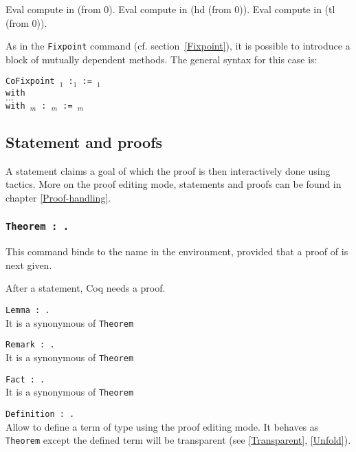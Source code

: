 \begin{coq_example}
Eval compute in (from 0).
Eval compute in (hd (from 0)).
Eval compute in (tl (from 0)).
\end{coq_example}

As in the \texttt{Fixpoint} command (cf. section~\ref{Fixpoint}), it
is possible to introduce a block of mutually dependent methods. The
general syntax for this case is:

{\tt CoFixpoint {\ident$_1$}  :{\type$_1$} := {\term$_1$}\\
     with\\
        \mbox{}\hspace{0.1cm} $\ldots$  \\
        with {\ident$_m$}   : {\type$_m$} := {\term$_m$}}

\subsection{Statement and proofs}

A statement claims a goal of which the proof is then interactively done
using tactics. More on the proof editing mode, statements and proofs can be
found in chapter \ref{Proof-handling}.

\subsubsection{\tt Theorem {\ident} : {\type}.}
This command binds {\type} to the name {\ident} in the
environment, provided that a proof of {\type} is next given.

After a statement, Coq needs a proof.

\begin{Variants} 

\item {\tt Lemma {\ident} : {\type}.}\\ 
It is a synonymous of \texttt{Theorem}
\item {\tt Remark {\ident} : {\type}.}\\ 
It is a synonymous of \texttt{Theorem}
 \item {\tt Fact {\ident} : {\type}.}\\ 
It is a synonymous of \texttt{Theorem}
\item {\tt Definition {\ident} : {\type}.} \\
Allow to define a term of type {\type} using the proof editing mode. It
behaves as {\tt Theorem} except the defined term will be transparent (see
\ref{Transparent}, \ref{Unfold}). 
\end{Variants}

